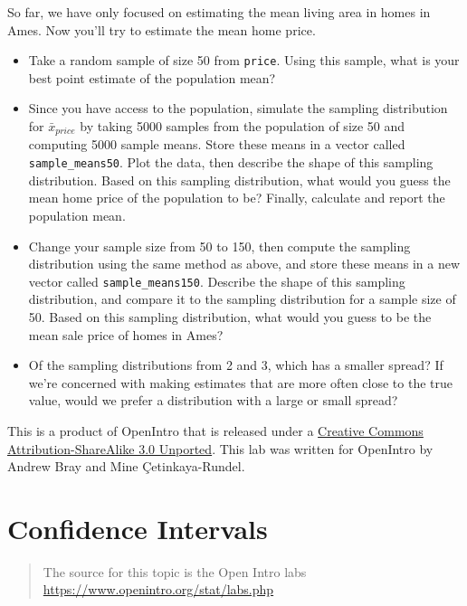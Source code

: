 \documentclass[]{book}
\theoremstyle{definition}
\theoremstyle{definition}
\theoremstyle{remark}
\begin{document}
So far, we have only focused on estimating the mean living area in homes
in Ames. Now you'll try to estimate the mean home price.

\begin{itemize}
\item
  Take a random sample of size 50 from \texttt{price}. Using this
  sample, what is your best point estimate of the population mean?
\item
  Since you have access to the population, simulate the sampling
  distribution for \(\bar{x}_{price}\) by taking 5000 samples from the
  population of size 50 and computing 5000 sample means. Store these
  means in a vector called \texttt{sample\_means50}. Plot the data, then
  describe the shape of this sampling distribution. Based on this
  sampling distribution, what would you guess the mean home price of the
  population to be? Finally, calculate and report the population mean.
\item
  Change your sample size from 50 to 150, then compute the sampling
  distribution using the same method as above, and store these means in
  a new vector called \texttt{sample\_means150}. Describe the shape of
  this sampling distribution, and compare it to the sampling
  distribution for a sample size of 50. Based on this sampling
  distribution, what would you guess to be the mean sale price of homes
  in Ames?
\item
  Of the sampling distributions from 2 and 3, which has a smaller
  spread? If we're concerned with making estimates that are more often
  close to the true value, would we prefer a distribution with a large
  or small spread?
\end{itemize}

\hypertarget{license}{}
This is a product of OpenIntro that is released under a
\href{http://creativecommons.org/licenses/by-sa/3.0}{Creative Commons
Attribution-ShareAlike 3.0 Unported}. This lab was written for OpenIntro
by Andrew Bray and Mine Çetinkaya-Rundel.

\hypertarget{confidence-intervals}{\chapter*{Confidence
Intervals}\label{confidence-intervals}}

\begin{quote}
The source for this topic is the Open Intro labs
\url{https://www.openintro.org/stat/labs.php}
\end{quote}
\end{document}
